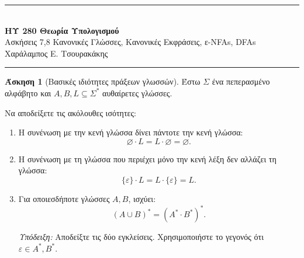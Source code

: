 \documentclass[11pt,a4paper]{article}
\newcommand{\horrule}[1]{\rule{\linewidth}{#1}}
\newcommand{\eps}{\varepsilon}
\theoremstyle{definition}
\newtheorem{question}{Άσκηση}
\begin{document}
\begin{center}
\horrule{0.4pt}\\[0.15cm]
{\large\textbf{ΗΥ 280 \textemdash{} Θεωρία Υπολογισμού}}\\[0.1cm]
{Ασκήσεις 7,8 \textemdash{} Κανονικές Γλώσσες, Κανονικές Εκφράσεις, ε-NFAs, DFAs}\\[0.1cm]
{Χαράλαμπος Ε. Τσουρακάκης}\\
\horrule{0.4pt}
\end{center}

\begin{center}\end{center}\medskip

\begin{question}[Βασικές ιδιότητες πράξεων γλωσσών]

Έστω $\Sigma$ ένα πεπερασμένο αλφάβητο
και $A,B,L\subseteq\Sigma^*$ αυθαίρετες γλώσσες.

Να αποδείξετε τις ακόλουθες ισότητες:

\begin{enumerate}

\item Η συνένωση με την κενή γλώσσα δίνει
πάντοτε την κενή γλώσσα:
\[
    \boxed{
    \varnothing\cdot L
    =L\cdot\varnothing
    =\varnothing.
    }
\]

\item Η συνένωση με τη γλώσσα
που περιέχει μόνο την κενή λέξη
δεν αλλάζει τη γλώσσα:
\[
    \boxed{
    \{\eps\}\cdot L
    =L\cdot\{\eps\}
    =L.
    }
\]

\item Για οποιεσδήποτε γλώσσες $A,B$,
ισχύει:
\[
    \boxed{
    (A\cup B)^*=(A^*\cdot B^*)^*.
    }
\]

\textit{Υπόδειξη:}
Αποδείξτε τις δύο εγκλείσεις.
Χρησιμοποιήστε το γεγονός ότι
$\eps\in A^*, B^*$.

\end{enumerate}

\end{question}
\end{document}
